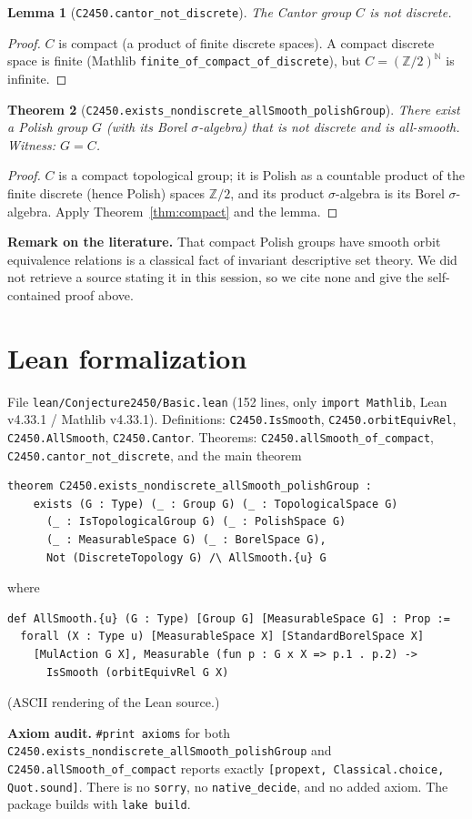 \documentclass[11pt]{article}
\newtheorem{theorem}{Theorem}
\newtheorem{lemma}[theorem]{Lemma}
\theoremstyle{definition}
\begin{document}
\begin{lemma}[\texttt{C2450.cantor\_not\_discrete}]
The Cantor group $C$ is not discrete.
\end{lemma}

\begin{proof}
$C$ is compact (a product of finite discrete spaces). A compact discrete space is finite (Mathlib
\texttt{finite\_of\_compact\_of\_discrete}), but $C=(\mathbb Z/2)^{\mathbb N}$ is infinite.
\end{proof}

\begin{theorem}[\texttt{C2450.exists\_nondiscrete\_allSmooth\_polishGroup}]
There exist a Polish group $G$ (with its Borel $\sigma$-algebra) that is not discrete and is
all-smooth. Witness: $G=C$.
\end{theorem}

\begin{proof}
$C$ is a compact topological group; it is Polish as a countable product of the finite discrete
(hence Polish) spaces $\mathbb Z/2$, and its product $\sigma$-algebra is its Borel $\sigma$-algebra.
Apply Theorem~\ref{thm:compact} and the lemma.
\end{proof}

\textbf{Remark on the literature.} That compact Polish groups have smooth orbit equivalence relations
is a classical fact of invariant descriptive set theory. We did not retrieve a source stating it in
this session, so we cite none and give the self-contained proof above.

\section{Lean formalization}

File \texttt{lean/Conjecture2450/Basic.lean} (152 lines, only \texttt{import Mathlib}, Lean
v4.33.1 / Mathlib v4.33.1). Definitions: \texttt{C2450.IsSmooth}, \texttt{C2450.orbitEquivRel},
\texttt{C2450.AllSmooth}, \texttt{C2450.Cantor}. Theorems: \texttt{C2450.allSmooth\_of\_compact},
\texttt{C2450.cantor\_not\_discrete}, and the main theorem
\begin{verbatim}
theorem C2450.exists_nondiscrete_allSmooth_polishGroup :
    exists (G : Type) (_ : Group G) (_ : TopologicalSpace G)
      (_ : IsTopologicalGroup G) (_ : PolishSpace G)
      (_ : MeasurableSpace G) (_ : BorelSpace G),
      Not (DiscreteTopology G) /\ AllSmooth.{u} G
\end{verbatim}
where
\begin{verbatim}
def AllSmooth.{u} (G : Type) [Group G] [MeasurableSpace G] : Prop :=
  forall (X : Type u) [MeasurableSpace X] [StandardBorelSpace X]
    [MulAction G X], Measurable (fun p : G x X => p.1 . p.2) ->
      IsSmooth (orbitEquivRel G X)
\end{verbatim}
(ASCII rendering of the Lean source.)

\textbf{Axiom audit.} \texttt{\#print axioms} for both
\texttt{C2450.exists\_nondiscrete\_allSmooth\_polishGroup} and
\texttt{C2450.allSmooth\_of\_compact} reports exactly
\texttt{[propext, Classical.choice, Quot.sound]}. There is no \texttt{sorry}, no
\texttt{native\_decide}, and no added axiom. The package builds with \texttt{lake build}.
\end{document}
